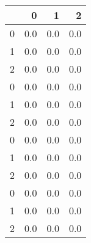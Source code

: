 \begin{tabular}{lrrr}
\toprule
{} &    0 &    1 &    2 \\
\midrule
0 &  0.0 &  0.0 &  0.0 \\
1 &  0.0 &  0.0 &  0.0 \\
2 &  0.0 &  0.0 &  0.0 \\
0 &  0.0 &  0.0 &  0.0 \\
1 &  0.0 &  0.0 &  0.0 \\
2 &  0.0 &  0.0 &  0.0 \\
0 &  0.0 &  0.0 &  0.0 \\
1 &  0.0 &  0.0 &  0.0 \\
2 &  0.0 &  0.0 &  0.0 \\
0 &  0.0 &  0.0 &  0.0 \\
1 &  0.0 &  0.0 &  0.0 \\
2 &  0.0 &  0.0 &  0.0 \\
\bottomrule
\end{tabular}
